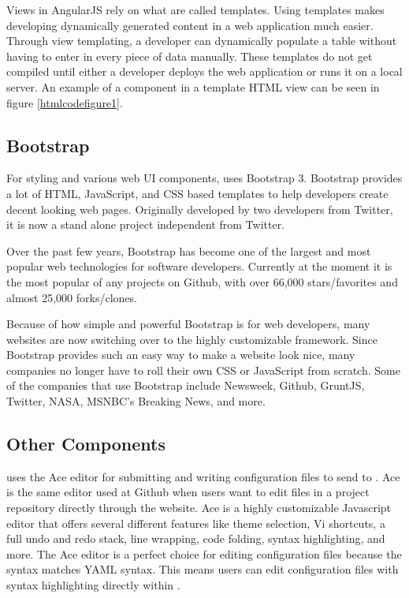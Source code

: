 Views in AngularJS rely on what are called templates. Using templates makes developing dynamically generated content in a web application much easier. Through view templating, a developer can dynamically populate a table without having to enter in every piece of data manually. These templates do not get compiled until either a developer deploys the web application or runs it on a local server. An example of a component in a template HTML view can be seen in figure \ref{htmlcodefigure1}.

\subsection{Bootstrap}

For styling and various web UI components, \projectName{} uses Bootstrap 3\cite{Note:Bootstrap:2014}. Bootstrap provides a lot of HTML, JavaScript, and CSS based templates to help developers create decent looking web pages. Originally developed by two developers from Twitter, it is now a stand alone project independent from Twitter.

Over the past few years, Bootstrap has become one of the largest and most popular web technologies for software developers. Currently at the moment it is the most popular of any projects on Github, with over 66,000 stars/favorites and almost 25,000 forks/clones\cite{Note:GithubStars:2014}.

Because of how simple and powerful Bootstrap is for web developers, many websites are now switching over to the highly customizable framework. Since Bootstrap provides such an easy way to make a website look nice, many companies no longer have to roll their own CSS or JavaScript from scratch. Some of the companies that use Bootstrap include Newsweek, Github, GruntJS, Twitter, NASA, MSNBC's Breaking News, and more\cite{Note:Bootstrap:2014}.

\subsection{Other Components}

\projectName{} uses the Ace editor\cite{Note:ACE:2014} for submitting and writing configuration files to send to \ancor{}. Ace is the same editor used at Github when users want to edit files in a project repository directly through the website. Ace is a highly customizable Javascript editor that offers several different features like theme selection, Vi shortcuts, a full undo and redo stack, line wrapping, code folding, syntax highlighting, and more. The Ace editor is a perfect choice for editing configuration files because the syntax matches YAML syntax. This means users can edit configuration files with syntax highlighting directly within \projectName{}.

